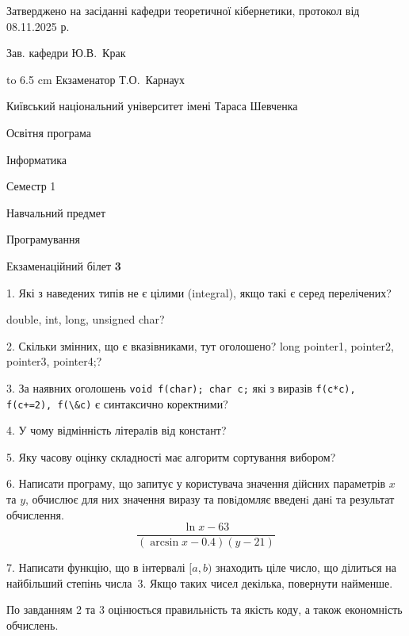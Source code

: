 \documentclass[12pt, ukrainian]{article}
\def\code#1{\Verb!#1!}
\begin{document}
{\smallskip\smallskip \begin {scriptsize} Затверджено на засіданні кафедри теоретичної кібернетики, протокол   від   08.11.2025 р.\par\smallskip\smallskip\smallskip\smallskip
{\parbox {6.5 cm} {Зав. кафедри \dotfill Ю.В.~Крак}}\hspace {0.7cm} {\hbox to 6.5 cm { Екзаменатор \dotfill Т.О.~Карнаух}} \end{scriptsize}}
\newpage
{{\begin {scriptsize}\par
{ \center  Київський національний університет імені Тараса Шевченка \par}
{\parbox {5 cm}{Освітня програма \hfill}{\parbox {7 cm}{Інформатика\hfill}}\parbox {6 cm}{\hfill Семестр 1}}\par
{\parbox {5 cm} {Навчальний предмет \hfill}\parbox {7 cm}{Програмування \hfill}\parbox {6cm}{\hfill}\par}\vspace{-15pt} \end{scriptsize}}{\center Екзаменаційний білет \No \textbf { 3 }\par}}
{%
1. Які з наведених типів не є цілими (integral), якщо такі є серед перелічених?

double, int, long, unsigned char?
\par
\vspace{2mm}
2. Скільки змінних, що є вказівниками, тут оголошено?
long pointer1, pointer2, pointer3, pointer4;?
\par
\vspace{2mm}
3. За наявних оголошень \code{void f(char); char c;} які з виразів \code{f(c*c), f(c+=2), f(\&c)} є синтаксично коректними?
\par
\vspace{2mm}
4. У чому відмінність літералів від констант?
\par
\vspace{2mm}
5. Яку часову оцінку складності має алгоритм сортування вибором?
\par
\vspace{2mm}
6. Написати програму, що запитує у користувача значення дійсних параметрів $x$ та $y$, обчислює для них значення виразу та повiдомляє введенi данi та результат обчислення.
$$\frac{\ln x - 63}{(\arcsin x - 0.4) (y - 21)}$$ 

\par
7. Написати функцію, що в інтервалі $[a, b)$ знаходить ціле число, що ділиться на найбільший степінь числа 3. Якщо таких чисел декілька, повернути найменше.

По завданням 2 та 3 оцінюється правильність та якість коду, а також економність обчислень.

}
\end{document}
